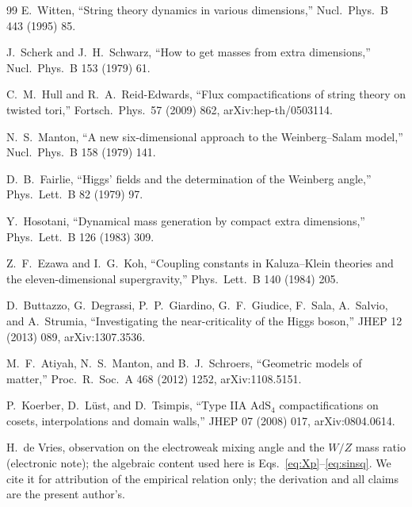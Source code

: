 \documentclass[11pt]{article}
\theoremstyle{plain}
\theoremstyle{definition}
\newcommand{\AdS}{\mathrm{AdS}}
\begin{document}
\begin{thebibliography}{99}
 E.\ Witten, ``String theory dynamics in various
dimensions,'' Nucl.\ Phys.\ B 443 (1995) 85.

 J.\ Scherk and J.\ H.\ Schwarz, ``How to get
masses from extra dimensions,'' Nucl.\ Phys.\ B 153 (1979) 61.

 C.\ M.\ Hull and R.\ A.\ Reid-Edwards, ``Flux
compactifications of string theory on twisted tori,'' Fortsch.\ Phys.\ 57
(2009) 862, arXiv:hep-th/0503114.

 N.\ S.\ Manton, ``A new six-dimensional approach to the
Weinberg--Salam model,'' Nucl.\ Phys.\ B 158 (1979) 141.

 D.\ B.\ Fairlie, ``Higgs' fields and the determination
of the Weinberg angle,'' Phys.\ Lett.\ B 82 (1979) 97.

 Y.\ Hosotani, ``Dynamical mass generation by compact
extra dimensions,'' Phys.\ Lett.\ B 126 (1983) 309.

 Z.\ F.\ Ezawa and I.\ G.\ Koh, ``Coupling constants in
Kaluza--Klein theories and the eleven-dimensional supergravity,'' Phys.\
Lett.\ B 140 (1984) 205.

 D.\ Buttazzo, G.\ Degrassi, P.\ P.\ Giardino,
G.\ F.\ Giudice, F.\ Sala, A.\ Salvio, and A.\ Strumia, ``Investigating the
near-criticality of the Higgs boson,'' JHEP 12 (2013) 089, arXiv:1307.3536.

 M.\ F.\ Atiyah, N.\ S.\ Manton, and
B.\ J.\ Schroers, ``Geometric models of matter,'' Proc.\ R.\ Soc.\ A 468
(2012) 1252, arXiv:1108.5151.

 P.\ Koerber, D.\ L\"ust, and D.\ Tsimpis,
``Type IIA $\AdS_4$ compactifications on cosets, interpolations and domain
walls,'' JHEP 07 (2008) 017, arXiv:0804.0614.

 H.\ de Vries, observation on the electroweak mixing angle
and the $W/Z$ mass ratio (electronic note); the algebraic content used here
is Eqs.~\eqref{eq:Xp}--\eqref{eq:sinsq}. We cite it for attribution of the
empirical relation only; the derivation and all claims are the present
author's.

\end{thebibliography}
\end{document}
